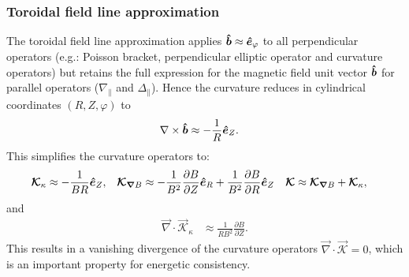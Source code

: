 \subsubsection{Toroidal field line approximation}\label{sec:torfieldlineapprox}
The toroidal field line approximation applies \(\bm{\hat{b}}\approx \bm{\hat{e}}_\varphi\) to all perpendicular operators (e.g.: Poisson bracket, perpendicular elliptic operator and curvature operators)
but retains the full expression for the magnetic field unit vector \(\bm{\hat{b}}\)
for parallel operators (\(\nabla_\parallel\) and \(\Delta_\parallel\)).
Hence the curvature reduces in cylindrical coordinates \((R,Z,\varphi)\) to
\begin{align}\label{eq:kappalowbeta}
 \nabla\times\bm{\hat{b}} &\approx -  \frac{1}{R} \bm{\hat{e}}_Z.
\end{align}
This simplifies the curvature operators to:
\begin{align}
{\boldsymbol{\mathcal{K}}}_{\kappa}  &\approx  -  \frac{1}{B R} \bm{\hat{e}}_Z , &
{\boldsymbol{ \mathcal{K} }}_{{\boldsymbol{\nabla}}  B}  &\approx  -\frac{1}{B^2}\frac{\partial B}{\partial Z}\bm{\hat{e}}_R +\frac{1}{B^2} \frac{\partial B}{\partial R}\bm{\hat{e}}_Z &
{\boldsymbol{ \mathcal{K} }} &\approx {\boldsymbol{ \mathcal{K} }}_{{\boldsymbol{\nabla}}  B}  +{\boldsymbol{ \mathcal{K} }}_{\kappa} ,
\end{align}
and
\begin{align}
 \vec{\nabla} \cdot \vec{\mathcal{K}}_{\kappa} &\approx \frac{1}{R B^2} \frac{\partial B}{\partial Z}.
\end{align}
This results in a vanishing divergence of the curvature operators \( \vec{\nabla} \cdot \vec{ \mathcal{K} } = 0\), which is an important property for energetic consistency.

